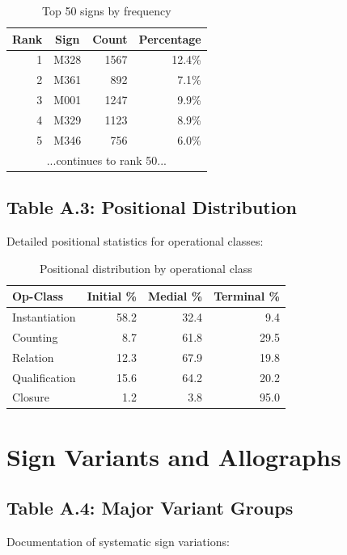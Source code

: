 \begin{table}[H]
\centering
\begin{tabular}{|r|c|r|r|}
\hline
\textbf{Rank} & \textbf{Sign} & \textbf{Count} & \textbf{Percentage} \\
\hline
1 & M328 & 1567 & 12.4\% \\
2 & M361 & 892 & 7.1\% \\
3 & M001 & 1247 & 9.9\% \\
4 & M329 & 1123 & 8.9\% \\
5 & M346 & 756 & 6.0\% \\
\hline
\multicolumn{4}{|c|}{...continues to rank 50...} \\
\hline
\end{tabular}
\caption{Top 50 signs by frequency}
\end{table}

\subsection*{Table A.3: Positional Distribution}

Detailed positional statistics for operational classes:

\begin{table}[H]
\centering
\begin{tabular}{|l|r|r|r|}
\hline
\textbf{Op-Class} & \textbf{Initial \%} & \textbf{Medial \%} & \textbf{Terminal \%} \\
\hline
Instantiation & 58.2 & 32.4 & 9.4 \\
Counting & 8.7 & 61.8 & 29.5 \\
Relation & 12.3 & 67.9 & 19.8 \\
Qualification & 15.6 & 64.2 & 20.2 \\
Closure & 1.2 & 3.8 & 95.0 \\
\hline
\end{tabular}
\caption{Positional distribution by operational class}
\end{table}

\section*{Sign Variants and Allographs}

\subsection*{Table A.4: Major Variant Groups}

Documentation of systematic sign variations:

